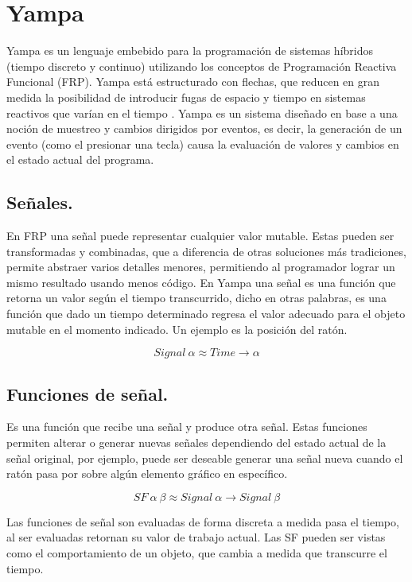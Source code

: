 \section{Yampa}

Yampa es un lenguaje embebido para la programación de sistemas híbridos (tiempo discreto y continuo) utilizando los conceptos de Programación Reactiva Funcional (FRP). Yampa está estructurado con flechas, que reducen en gran medida la posibilidad de introducir fugas de espacio y tiempo en sistemas reactivos que varían en el tiempo \cite{wiki:Yampa}. Yampa es un sistema diseñado en base a una noción de muestreo y cambios dirigidos por eventos, es decir, la generación de un evento (como el presionar una tecla) causa la evaluación de valores y cambios en el estado actual del programa.

\subsection{Señales.}
En FRP una señal puede representar cualquier valor mutable. Estas pueden ser transformadas y combinadas, que a diferencia de otras soluciones más tradiciones, permite abstraer varios detalles menores, permitiendo al programador lograr un mismo resultado usando menos código. En Yampa una señal es una función que retorna un valor según el tiempo transcurrido, dicho en otras palabras, es una función que dado un tiempo determinado regresa el valor adecuado para el objeto mutable en el momento indicado. Un ejemplo es la posición del ratón.

\begin{equation}
Signal \ \alpha \approx Time \rightarrow \alpha
\end{equation}

\subsection{Funciones de señal.}
Es una función que recibe una señal y produce otra señal. Estas funciones permiten alterar o generar nuevas señales dependiendo del estado actual de la señal original, por ejemplo, puede ser deseable generar una señal nueva cuando el ratón pasa por sobre algún elemento gráfico en específico.

\begin{equation}
SF \ \alpha \ \beta \approx Signal \ \alpha \rightarrow Signal \ \beta
\end{equation}

Las funciones de señal son evaluadas de forma discreta a medida pasa el tiempo, al ser evaluadas retornan su valor de trabajo actual. Las SF pueden ser vistas como el comportamiento de un objeto, que cambia a medida que transcurre el tiempo.

